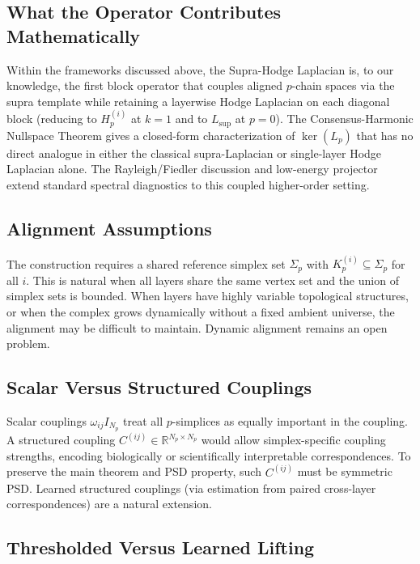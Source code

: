 \documentclass[11pt]{article}
\theoremstyle{definition}
\theoremstyle{remark}
\newcommand{\R}{\mathbb{R}}
\newcommand{\Lsup}{L_{\mathrm{sup}}}
\begin{document}
\subsection{What the Operator Contributes Mathematically}

Within the frameworks discussed above, the Supra-Hodge Laplacian is, to our
knowledge, the first block operator that couples aligned $p$-chain spaces via
the supra template while retaining a layerwise Hodge Laplacian on each diagonal
block (reducing to $H_p^{(i)}$ at $k=1$ and to $\Lsup$ at $p=0$). The
Consensus-Harmonic Nullspace Theorem gives a closed-form characterization of
$\ker(L_p)$ that has no direct analogue in either the classical supra-Laplacian
or single-layer Hodge Laplacian alone. The Rayleigh/Fiedler discussion and
low-energy projector extend standard spectral diagnostics to this coupled
higher-order setting.

\subsection{Alignment Assumptions}

The construction requires a shared reference simplex set $\Sigma_p$ with
$K_p^{(i)}\subseteq\Sigma_p$ for all $i$. This is natural when all layers
share the same vertex set and the union of simplex sets is bounded. When layers
have highly variable topological structures, or when the complex grows
dynamically without a fixed ambient universe, the alignment may be difficult to
maintain. Dynamic alignment remains an open problem.

\subsection{Scalar Versus Structured Couplings}

Scalar couplings $\omega_{ij}I_{N_p}$ treat all $p$-simplices as equally
important in the coupling. A structured coupling $C^{(ij)}\in\R^{N_p\times N_p}$
would allow simplex-specific coupling strengths, encoding biologically or scientifically interpretable correspondences. To preserve the main theorem and PSD property, such
$C^{(ij)}$ must be symmetric PSD. Learned structured couplings (via estimation from paired cross-layer correspondences) are a natural extension.

\subsection{Thresholded Versus Learned Lifting}
\end{document}

